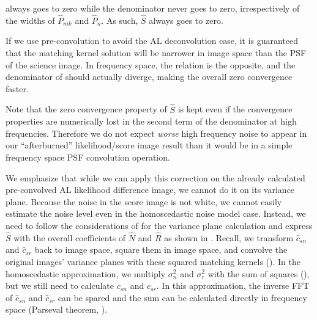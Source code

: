 always goes to zero while the denominator never goes to zero,
irrespectively of the widths of \(\hat{P}_{mk}\) and
\(\hat{P}_{n}\). As such, \(\hat{S}\) always goes to zero.
%
\par If we use pre-convolution to avoid the AL deconvolution case, it
is guaranteed that the matching kernel solution will be narrower in
image space than the PSF of the science image. In frequency space, the
relation is the opposite, and the denominator of  should
actually diverge, making the overall zero convergence faster.
%
\par Note that the zero convergence property of \(\hat{S}\) is kept
even if the convergence properties are numerically lost in the second
term of the denominator at high frequencies. Therefore we do not
expect \emph{worse} high frequency noise to appear in our ``afterburned''
likelihood/score image result than it would be in a simple frequency
space PSF convolution operation.
%
\par We emphasize that while we can apply this correction on the
already calculated pre-convolved AL likelihood difference image, we
cannot do it on its variance plane. Because the noise in the score
image is not white, we cannot easily estimate the noise level even in
the homoscedastic noise model case. Instead, we need to follow the
considerations of  for the variance plane
calculation and express \(\hat{S}\) with the overall coefficients of
\(\hat{N}\) and \(\hat{R}\) as shown in . Recall, we
transform \(\hat{c}_{sn}\) and \(\hat{c}_{sr}\) back to image space,
square them in image space, and convolve the original images' variance
planes with these squared matching kernels (). In the
homoscedastic approximation, we multiply \(\sigma_n^2\) and
\(\sigma_r^2\) with the sum of squares (), but we
still need to calculate \(c_{sn}\) and \(c_{sr}\). In this
approximation, the inverse FFT of \(\hat{c}_{sn}\) and
\(\hat{c}_{sr}\) can be spared and the sum can be calculated directly
in frequency space (Parseval theorem, ).
%
